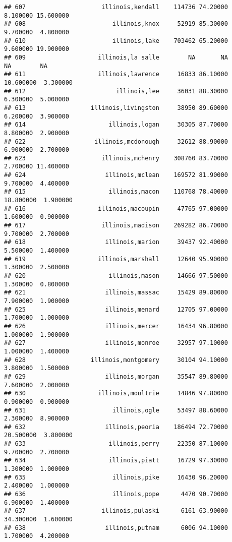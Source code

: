 \documentclass[
]{article}
\begin{document}
\begin{verbatim}
## 607                     illinois,kendall    114736 74.20000  8.100000 15.600000
## 608                        illinois,knox     52919 85.30000  9.700000  4.800000
## 610                        illinois,lake    703462 65.20000  9.600000 19.900000
## 609                    illinois,la salle        NA       NA        NA        NA
## 611                    illinois,lawrence     16833 86.10000 10.600000  3.300000
## 612                         illinois,lee     36031 88.30000  6.300000  5.000000
## 613                  illinois,livingston     38950 89.60000  6.200000  3.900000
## 614                       illinois,logan     30305 87.70000  8.800000  2.900000
## 622                   illinois,mcdonough     32612 88.90000  6.900000  2.700000
## 623                     illinois,mchenry    308760 83.70000  2.700000 11.400000
## 624                      illinois,mclean    169572 81.90000  9.700000  4.400000
## 615                       illinois,macon    110768 78.40000 18.800000  1.900000
## 616                    illinois,macoupin     47765 97.00000  1.600000  0.900000
## 617                     illinois,madison    269282 86.70000  9.700000  2.700000
## 618                      illinois,marion     39437 92.40000  5.500000  1.400000
## 619                    illinois,marshall     12640 95.90000  1.300000  2.500000
## 620                       illinois,mason     14666 97.50000  1.300000  0.800000
## 621                      illinois,massac     15429 89.80000  7.900000  1.900000
## 625                      illinois,menard     12705 97.00000  1.700000  1.000000
## 626                      illinois,mercer     16434 96.80000  1.000000  1.900000
## 627                      illinois,monroe     32957 97.10000  1.000000  1.400000
## 628                  illinois,montgomery     30104 94.10000  3.800000  1.500000
## 629                      illinois,morgan     35547 89.80000  7.600000  2.000000
## 630                    illinois,moultrie     14846 97.80000  0.900000  0.900000
## 631                        illinois,ogle     53497 88.60000  2.300000  8.900000
## 632                      illinois,peoria    186494 72.70000 20.500000  3.800000
## 633                       illinois,perry     22350 87.10000  9.700000  2.700000
## 634                       illinois,piatt     16729 97.30000  1.300000  1.000000
## 635                        illinois,pike     16430 96.20000  2.400000  1.000000
## 636                        illinois,pope      4470 90.70000  6.900000  1.400000
## 637                     illinois,pulaski      6161 63.90000 34.300000  1.600000
## 638                      illinois,putnam      6006 94.10000  1.700000  4.200000

\end{verbatim}
\end{document}

